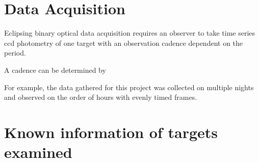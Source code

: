 \section{Data Acquisition}
Eclipsing binary optical data acquisition requires an observer to take time series ccd photometry of one target with an observation cadence dependent on the period.

A cadence can be determined by 

For example, the data gathered for this project was collected on multiple nights and observed on the order of hours with evenly timed frames.

\section{Known information of targets examined}

